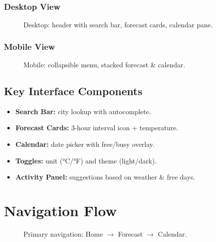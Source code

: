 \documentclass[11pt,a4paper]{article}
\begin{document}
\subsubsection{Desktop View}
\begin{figure}[ht]
  \centering
  \caption{Desktop: header with search bar, forecast cards, calendar pane.}
\end{figure}

\subsubsection{Mobile View}
\begin{figure}[ht]
  \centering
  \caption{Mobile: collapsible menu, stacked forecast \& calendar.}
\end{figure}

\subsection{Key Interface Components}
\begin{itemize}[nosep]
  \item \textbf{Search Bar:} city lookup with autocomplete.
  \item \textbf{Forecast Cards:} 3-hour interval icon + temperature.
  \item \textbf{Calendar:} date picker with free/busy overlay.
  \item \textbf{Toggles:} unit (°C/°F) and theme (light/dark).
  \item \textbf{Activity Panel:} suggestions based on weather \& free days.
\end{itemize}

\section{Navigation Flow}
\begin{figure}[ht]
  \centering
  \caption{Primary navigation: Home $\to$ Forecast $\to$ Calendar.}
\end{figure}
\end{document}
